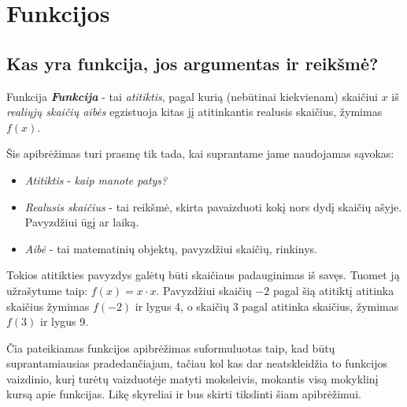 \documentclass{article}
\begin{document}
\section*{Funkcijos}
\subsection*{Kas yra funkcija, jos argumentas ir reikšmė?}
\begin{mybox}{Funkcija}
\textbf{\textit{Funkcija}} - tai \textit{atitiktis}, pagal kurią (nebūtinai kiekvienam) skaičiui $x$ iš \textit{realiųjų skaičių aibės} egzistuoja kitas jį atitinkantis realusis skaičius, žymimas $f(x)$.
\end{mybox}

Šis apibrėžimas turi prasmę tik tada, kai suprantame jame naudojamas sąvokas:
\begin{itemize}
\item \textit{Atitiktis} - \textit{kaip manote patys?}
\item \textit{Realusis skaičius} - tai reikšmė, skirta pavaizduoti kokį nors dydį skaičių ašyje. Pavyzdžiui ūgį ar laiką.
\item \textit{Aibė} - tai matematinių objektų, pavyzdžiui skaičių, rinkinys.
\end{itemize}

\begin{minipage}[m]{0.69\textwidth}
Tokios atitikties pavyzdys galėtų būti skaičiaus padauginimas iš savęs. Tuomet ją užrašytume taip: $f(x)=x\cdot x$. Pavyzdžiui skaičių $-2$ pagal šią atitiktį atitinka skaičius žymimas $f(-2)$ ir lygus 4, o skaičių 3 pagal atitinka skaičius, žymimas $f(3)$ ir lygus 9.

Čia pateikiamas funkcijos apibrėžimas suformuluotas taip, kad būtų suprantamiausias pradedančiajam, tačiau kol kas dar neatskleidžia to funkcijos vaizdinio, kurį turėtų vaizduotėje matyti moksleivis, mokantis visą mokyklinį kursą apie funkcijas. Likę skyreliai ir bus skirti tikslinti šiam apibrėžimui.
\end{minipage}
\begin{minipage}[b]{0.3\textwidth}
\begin{center}
\end{center}
\end{minipage}
\end{document}
